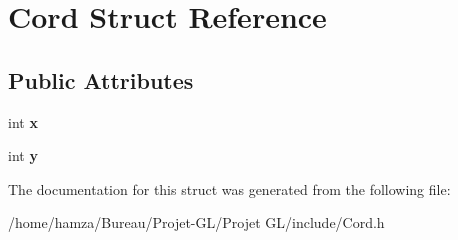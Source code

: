 \section{Cord Struct Reference}
\label{struct_cord}
\subsection*{Public Attributes}
\begin{DoxyCompactItemize}
\item 
int {\bfseries x}\label{struct_cord_afb1c4bf87bc588dea27d45058146c028}

\item 
int {\bfseries y}\label{struct_cord_acad0fdd03b104ba6d363b9e48ea8a1a7}

\end{DoxyCompactItemize}


The documentation for this struct was generated from the following file\+:\begin{DoxyCompactItemize}
\item 
/home/hamza/\+Bureau/\+Projet-\/\+G\+L/\+Projet G\+L/include/Cord.\+h\end{DoxyCompactItemize}
